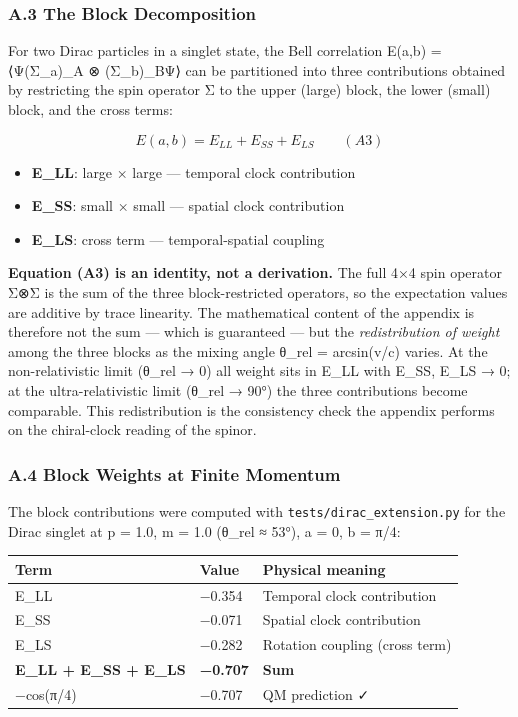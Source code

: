 \documentclass[
]{article}
\newcounter{none} %
\providecommand{\tightlist}{%
  \setlength{\itemsep}{0pt}\setlength{\parskip}{0pt}}
\begin{document}
\subsubsection{A.3 The Block
Decomposition}\label{a.3-the-block-decomposition}

For two Dirac particles in a singlet state, the Bell correlation E(a,b)
= ⟨Ψ\textbar(Σ\_a)\_A ⊗ (Σ\_b)\_B\textbar Ψ⟩ can be partitioned into
three contributions obtained by restricting the spin operator Σ to the
upper (large) block, the lower (small) block, and the cross terms:

\[E(a, b) = E_{LL} + E_{SS} + E_{LS} \qquad (A3)\]

\begin{itemize}
\tightlist
\item
  \textbf{E\_LL}: large × large --- temporal clock contribution
\item
  \textbf{E\_SS}: small × small --- spatial clock contribution
\item
  \textbf{E\_LS}: cross term --- temporal-spatial coupling
\end{itemize}

\textbf{Equation (A3) is an identity, not a derivation.} The full 4×4
spin operator Σ⊗Σ is the sum of the three block-restricted operators, so
the expectation values are additive by trace linearity. The mathematical
content of the appendix is therefore not the sum --- which is guaranteed
--- but the \emph{redistribution of weight} among the three blocks as
the mixing angle θ\_rel = arcsin(v/c) varies. At the non-relativistic
limit (θ\_rel → 0) all weight sits in E\_LL with E\_SS, E\_LS → 0; at
the ultra-relativistic limit (θ\_rel → 90°) the three contributions
become comparable. This redistribution is the consistency check the
appendix performs on the chiral-clock reading of the spinor.

\subsubsection{A.4 Block Weights at Finite
Momentum}\label{a.4-block-weights-at-finite-momentum}

The block contributions were computed with
\texttt{tests/dirac\_extension.py} for the Dirac singlet at p = 1.0, m =
1.0 (θ\_rel ≈ 53°), a = 0, b = π/4:

{\def\LTcaptype{none} %
\begin{longtable}[]{@{}lll@{}}
\toprule\noalign{}
Term & Value & Physical meaning \\
\midrule\noalign{}
\endhead
\bottomrule\noalign{}
\endlastfoot
E\_LL & −0.354 & Temporal clock contribution \\
E\_SS & −0.071 & Spatial clock contribution \\
E\_LS & −0.282 & Rotation coupling (cross term) \\
\textbf{E\_LL + E\_SS + E\_LS} & \textbf{−0.707} & \textbf{Sum} \\
−cos(π/4) & −0.707 & QM prediction ✓ \\
\end{longtable}
}
\end{document}
